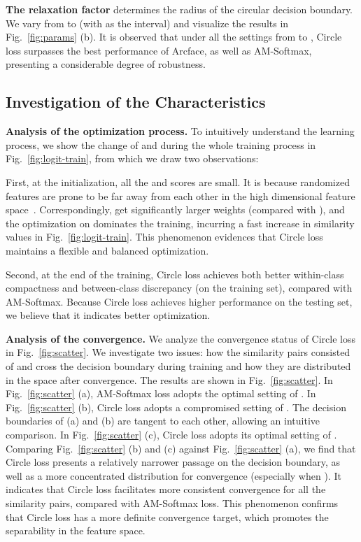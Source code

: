 \documentclass[10pt,twocolumn,letterpaper]{article}
\begin{document}
\textbf{The relaxation factor } determines the radius of the circular decision boundary. We vary  from  to  (with  as the interval) and visualize the results in Fig.~\ref{fig:params} (b). It is observed that under all the settings from  to , Circle loss surpasses the best performance of Arcface, as well as AM-Softmax, presenting a considerable degree of robustness. 


\subsection{Investigation of the Characteristics}\label{sec:exp_mechanism}

\textbf{Analysis of the optimization process.}\quad
To intuitively understand the learning process, we show the change of  and  during the whole training process in Fig.~\ref{fig:logit-train}, from which we draw two observations:

First, at the initialization, all the  and  scores are small. It is because randomized features are prone to be far away from each other in the high dimensional feature space~\cite{Zhang2019AdaCosAS,helanqing_dissection}. Correspondingly,  get significantly larger weights (compared with ), and the optimization on  dominates the training, incurring a fast increase in similarity values in Fig.~\ref{fig:logit-train}. This phenomenon evidences that Circle loss maintains a flexible and balanced optimization.
 
Second, at the end of the training, Circle loss achieves both better within-class compactness and between-class discrepancy (on the training set), compared with AM-Softmax. Because Circle loss achieves higher performance on the testing set, we believe that it indicates better optimization.



\textbf{Analysis of the convergence.}\quad
We analyze the convergence status of Circle loss in Fig.~\ref{fig:scatter}.
We investigate two issues: how the similarity pairs consisted of  and  cross the decision boundary during training and how they are distributed in the  space after convergence. The results are shown in Fig.~\ref{fig:scatter}. In Fig.~\ref{fig:scatter} (a), AM-Softmax loss adopts the optimal setting of . In Fig.~\ref{fig:scatter} (b), Circle loss adopts a compromised setting of . The decision boundaries of (a) and (b) are tangent to each other, allowing an intuitive comparison. In Fig.~\ref{fig:scatter} (c), Circle loss adopts its optimal setting of . Comparing Fig.~\ref{fig:scatter} (b) and (c) against Fig.~\ref{fig:scatter} (a), we find that Circle loss presents a relatively narrower passage on the decision boundary, as well as a more concentrated distribution for convergence (especially when ). It indicates that Circle loss facilitates more consistent convergence for all the similarity pairs, compared with AM-Softmax loss. 
This phenomenon confirms that Circle loss has a more definite convergence target, which promotes the separability in the feature space.
\end{document}
